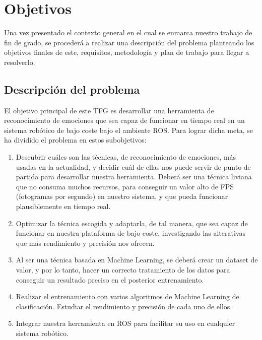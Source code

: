 \chapter{Objetivos}
\label{cap:capitulo2}

\vspace{1cm}

Una vez presentado el contexto general en el cual se enmarca nuestro trabajo de fin de grado, se procederá a realizar una descripción del problema planteando los objetivos finales de este, requisitos, metodología y plan de trabajo para llegar a resolverlo.

\section{Descripción del problema}
\label{sec:descripcion}

El objetivo principal de este TFG es desarrollar una herramienta de reconocimiento de emociones que sea capaz de funcionar en tiempo real en un sistema robótico de bajo coste bajo el ambiente ROS. Para lograr dicha meta, se ha dividido el problema en estos subobjetivos:
\begin{enumerate}
    \item Descubrir cuáles son las técnicas, de reconocimiento de emociones, más usadas en la actualidad, y decidir cuál de ellas nos puede servir de punto de partida para desarrollar nuestra herramienta. Deberá ser una técnica liviana que no consuma muchos recursos, para conseguir un valor alto de FPS (fotogramas por segundo) en nuestro sistema, y que pueda funcionar plausiblemente en tiempo real.
    
    \item Optimizar la técnica escogida y adaptarla, de tal manera, que sea capaz de funcionar en nuestra plataforma de bajo coste, investigando las alterativas que más rendimiento y precisión nos ofrecen.
    
    \item Al ser una técnica basada en Machine Learning, se deberá crear un dataset de valor, y por lo tanto, hacer un correcto tratamiento de los datos para conseguir un resultado preciso en el posterior entrenamiento.
    
    \item Realizar el entrenamiento con varios algoritmos de Machine Learning de clasificación. Estudiar el rendimiento y precisión de cada uno de ellos.
    
    \item Integrar nuestra herramienta en ROS para facilitar su uso en cualquier sistema robótico.
\end{enumerate}


